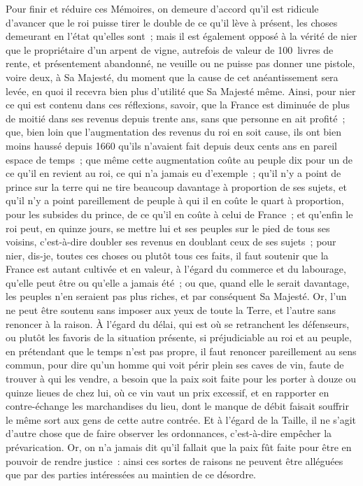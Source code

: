 \documentclass[french,twoside]{book} %
\begin{document}
Pour finir et réduire ces Mémoires, on demeure d’accord qu’il est ridicule d’avancer que le roi puisse tirer le double de ce qu’il lève à présent, les choses demeurant en l’état qu’elles sont ; mais il est également opposé à la vérité de nier que le propriétaire d’un arpent de vigne, autrefois de valeur de 100 livres de rente, et présentement abandonné, ne veuille ou ne puisse pas donner une pistole, voire deux, à Sa Majesté, du moment que la cause de cet anéantissement sera levée, en quoi il recevra bien plus d’utilité que Sa Majesté même. Ainsi, pour nier ce qui est contenu dans ces réflexions, savoir, que la France est diminuée de plus de moitié dans ses revenus depuis trente ans, sans que personne en ait profité ; que, bien loin que l’augmentation des revenus du roi en soit cause, ils ont bien moins haussé depuis 1660 qu’ils n’avaient fait depuis deux cents ans en pareil espace de temps ; que même cette augmentation coûte au peuple dix pour un de ce qu’il en revient au roi, ce qui n’a jamais eu d’exemple ; qu’il n’y a point de prince sur la terre qui ne tire beaucoup davantage à proportion de ses sujets, et qu’il n’y a point pareillement de peuple à qui il en coûte le quart à proportion, pour les subsides du prince, de ce qu’il en coûte à celui de France ; et qu’enfin le roi peut, en quinze jours, se mettre lui et ses peuples sur le pied de tous ses voisins, c’est-à-dire doubler ses revenus en doublant ceux de ses sujets ; pour nier, dis-je, toutes ces choses ou plutôt tous ces faits, il faut soutenir que la France est autant cultivée et en valeur, à l’égard du commerce et du labourage, qu’elle peut être ou qu’elle a jamais été ; ou que, quand elle le serait davantage, les peuples n’en seraient pas plus riches, et par conséquent Sa Majesté. Or, l’un ne peut être soutenu sans imposer aux yeux de toute la Terre, et l’autre sans renoncer à la raison. À l’égard du délai, qui est où se retranchent les défenseurs, ou plutôt les favoris de la situation présente, si préjudiciable au roi et au peuple, en prétendant que le temps n’est pas propre, il faut renoncer pareillement au sens commun, pour dire qu’un homme qui voit périr plein ses caves de vin, faute de trouver à qui les vendre, a besoin que la paix soit faite pour les porter à douze ou quinze lieues de chez lui, où ce vin vaut un prix excessif, et en rapporter en contre-échange les marchandises du lieu, dont le manque de débit faisait souffrir le même sort aux gens de cette autre contrée. Et à l’égard de la Taille, il ne s’agit d’autre chose que de faire observer les ordonnances, c’est-à-dire empêcher la prévarication. Or, on n’a jamais dit qu’il fallait que la paix fût faite pour être en pouvoir de rendre justice : ainsi ces sortes de raisons ne peuvent être alléguées que par des parties intéressées au maintien de ce désordre.
\end{document}
